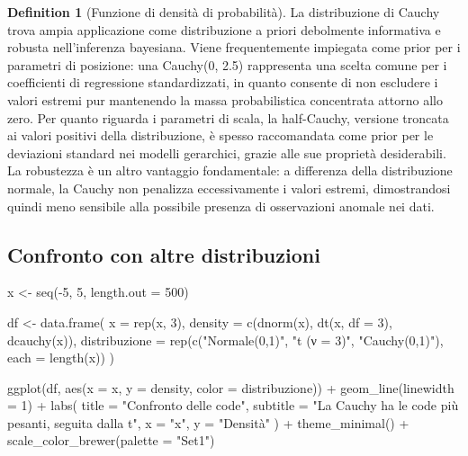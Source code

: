\documentclass[
  letterpaper,
  DIV=11,
  numbers=noendperiod,
  oneside]{scrreprt}
\newenvironment{Shaded}{\begin{snugshade}}{\end{snugshade}}
\newcommand{\AttributeTok}[1]{\textcolor[rgb]{0.40,0.45,0.13}{#1}}
\newcommand{\DecValTok}[1]{\textcolor[rgb]{0.68,0.00,0.00}{#1}}
\newcommand{\FunctionTok}[1]{\textcolor[rgb]{0.28,0.35,0.67}{#1}}
\newcommand{\NormalTok}[1]{\textcolor[rgb]{0.00,0.23,0.31}{#1}}
\newcommand{\OtherTok}[1]{\textcolor[rgb]{0.00,0.23,0.31}{#1}}
\newcommand{\SpecialCharTok}[1]{\textcolor[rgb]{0.37,0.37,0.37}{#1}}
\newcommand{\StringTok}[1]{\textcolor[rgb]{0.13,0.47,0.30}{#1}}
\theoremstyle{definition}
\theoremstyle{plain}
\theoremstyle{definition}
\newtheorem{definition}{Definition}[chapter]
\theoremstyle{remark}
\begin{document}
\begin{definition}[Funzione di densità di
probabilità]
La distribuzione di Cauchy trova ampia applicazione come distribuzione a
priori debolmente informativa e robusta nell'inferenza bayesiana. Viene
frequentemente impiegata come prior per i parametri di posizione: una
Cauchy(0, 2.5) rappresenta una scelta comune per i coefficienti di
regressione standardizzati, in quanto consente di non escludere i valori
estremi pur mantenendo la massa probabilistica concentrata attorno allo
zero. Per quanto riguarda i parametri di scala, la half-Cauchy, versione
troncata ai valori positivi della distribuzione, è spesso raccomandata
come prior per le deviazioni standard nei modelli gerarchici, grazie
alle sue proprietà desiderabili. La robustezza è un altro vantaggio
fondamentale: a differenza della distribuzione normale, la Cauchy non
penalizza eccessivamente i valori estremi, dimostrandosi quindi meno
sensibile alla possibile presenza di osservazioni anomale nei dati.

\subsection{Confronto con altre
distribuzioni}\label{confronto-con-altre-distribuzioni}

\begin{Shaded}
\begin{Highlighting}[]
\NormalTok{x }\OtherTok{\textless{}{-}} \FunctionTok{seq}\NormalTok{(}\SpecialCharTok{{-}}\DecValTok{5}\NormalTok{, }\DecValTok{5}\NormalTok{, }\AttributeTok{length.out =} \DecValTok{500}\NormalTok{)}

\NormalTok{df }\OtherTok{\textless{}{-}} \FunctionTok{data.frame}\NormalTok{(}
  \AttributeTok{x =} \FunctionTok{rep}\NormalTok{(x, }\DecValTok{3}\NormalTok{),}
  \AttributeTok{density =} \FunctionTok{c}\NormalTok{(}\FunctionTok{dnorm}\NormalTok{(x), }\FunctionTok{dt}\NormalTok{(x, }\AttributeTok{df =} \DecValTok{3}\NormalTok{), }\FunctionTok{dcauchy}\NormalTok{(x)),}
  \AttributeTok{distribuzione =} \FunctionTok{rep}\NormalTok{(}\FunctionTok{c}\NormalTok{(}\StringTok{"Normale(0,1)"}\NormalTok{, }\StringTok{"t (ν = 3)"}\NormalTok{, }\StringTok{"Cauchy(0,1)"}\NormalTok{), }\AttributeTok{each =} \FunctionTok{length}\NormalTok{(x))}
\NormalTok{)}

\FunctionTok{ggplot}\NormalTok{(df, }\FunctionTok{aes}\NormalTok{(}\AttributeTok{x =}\NormalTok{ x, }\AttributeTok{y =}\NormalTok{ density, }\AttributeTok{color =}\NormalTok{ distribuzione)) }\SpecialCharTok{+}
  \FunctionTok{geom\_line}\NormalTok{(}\AttributeTok{linewidth =} \DecValTok{1}\NormalTok{) }\SpecialCharTok{+}
  \FunctionTok{labs}\NormalTok{(}
    \AttributeTok{title =} \StringTok{"Confronto delle code"}\NormalTok{,}
    \AttributeTok{subtitle =} \StringTok{"La Cauchy ha le code più pesanti, seguita dalla t"}\NormalTok{,}
    \AttributeTok{x =} \StringTok{"x"}\NormalTok{, }\AttributeTok{y =} \StringTok{"Densità"}
\NormalTok{  ) }\SpecialCharTok{+}
  \FunctionTok{theme\_minimal}\NormalTok{() }\SpecialCharTok{+}
  \FunctionTok{scale\_color\_brewer}\NormalTok{(}\AttributeTok{palette =} \StringTok{"Set1"}\NormalTok{)}
\end{Highlighting}
\end{Shaded}


\end{definition}
\end{document}
